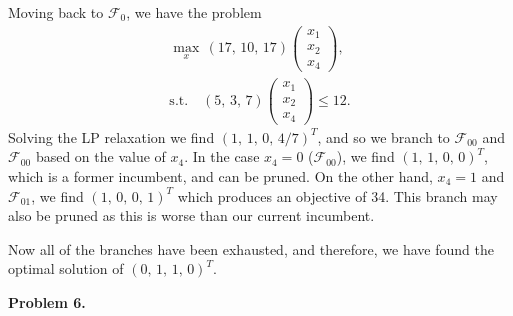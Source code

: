 \documentclass[11pt,a4paper]{article}
\begin{document}
\begin{enumerate}[i)]
	Moving back to $\mathcal{F}_{0}$, we have the problem
	\begin{gather*}
		\max_x \, (17, \, 10, \, 17)
		\begin{pmatrix}
			x_1 \\
			x_2 \\
			x_4
		\end{pmatrix}, \\
		\text{s.t.} \quad (5, \, 3, \, 7)
		\begin{pmatrix}
			x_1 \\
			x_2 \\
			x_4
		\end{pmatrix}
		\leq 12.
	\end{gather*}
	Solving the LP relaxation we find $(1, \, 1, \, 0, \, 4/7)^T$, and so we branch to $\mathcal{F}_{00}$ and $\mathcal{F}_{00}$ based on the value of $x_4$. In the case $x_4 = 0$ ($\mathcal{F}_{00}$), we find $(1, \, 1, \, 0, \, 0)^T$, which is a former incumbent, and can be pruned. On the other hand, $x_4 = 1$ and $\mathcal{F}_{01}$, we find $(1, \, 0, \, 0, \, 1)^T$ which produces an objective of 34. This branch may also be pruned as this is worse than our current incumbent.

	Now all of the branches have been exhausted, and therefore, we have found the optimal solution of $(0, \, 1, \, 1, \, 0)^T$.
\end{enumerate}

\textbf{Problem 6.}
\end{document}
